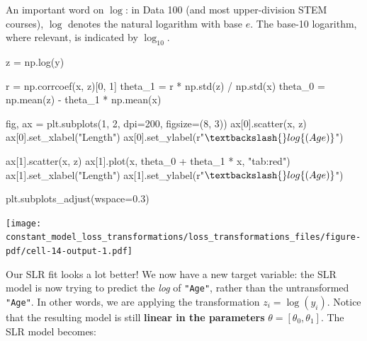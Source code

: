 \documentclass[
  letterpaper,
  DIV=11,
  numbers=noendperiod]{scrreprt}
\newenvironment{Shaded}{\begin{snugshade}}{\end{snugshade}}
\newcommand{\DecValTok}[1]{\textcolor[rgb]{0.68,0.00,0.00}{#1}}
\newcommand{\FloatTok}[1]{\textcolor[rgb]{0.68,0.00,0.00}{#1}}
\newcommand{\NormalTok}[1]{\textcolor[rgb]{0.00,0.23,0.31}{#1}}
\newcommand{\OperatorTok}[1]{\textcolor[rgb]{0.37,0.37,0.37}{#1}}
\newcommand{\StringTok}[1]{\textcolor[rgb]{0.13,0.47,0.30}{#1}}
\newcommand{\VerbatimStringTok}[1]{\textcolor[rgb]{0.13,0.47,0.30}{#1}}
\begin{document}
An important word on \(\log\): in Data 100 (and most upper-division STEM
courses), \(\log\) denotes the natural logarithm with base \(e\). The
base-10 logarithm, where relevant, is indicated by \(\log_{10}\).

\begin{Shaded}
\begin{Highlighting}[]
\NormalTok{z }\OperatorTok{=}\NormalTok{ np.log(y)}

\NormalTok{r }\OperatorTok{=}\NormalTok{ np.corrcoef(x, z)[}\DecValTok{0}\NormalTok{, }\DecValTok{1}\NormalTok{]}
\NormalTok{theta\_1 }\OperatorTok{=}\NormalTok{ r }\OperatorTok{*}\NormalTok{ np.std(z) }\OperatorTok{/}\NormalTok{ np.std(x)}
\NormalTok{theta\_0 }\OperatorTok{=}\NormalTok{ np.mean(z) }\OperatorTok{{-}}\NormalTok{ theta\_1 }\OperatorTok{*}\NormalTok{ np.mean(x)}

\NormalTok{fig, ax }\OperatorTok{=}\NormalTok{ plt.subplots(}\DecValTok{1}\NormalTok{, }\DecValTok{2}\NormalTok{, dpi}\OperatorTok{=}\DecValTok{200}\NormalTok{, figsize}\OperatorTok{=}\NormalTok{(}\DecValTok{8}\NormalTok{, }\DecValTok{3}\NormalTok{))}
\NormalTok{ax[}\DecValTok{0}\NormalTok{].scatter(x, z)}
\NormalTok{ax[}\DecValTok{0}\NormalTok{].set\_xlabel(}\StringTok{"Length"}\NormalTok{)}
\NormalTok{ax[}\DecValTok{0}\NormalTok{].set\_ylabel(}\VerbatimStringTok{r"$\textbackslash{}log\{(Age)\}$"}\NormalTok{)}

\NormalTok{ax[}\DecValTok{1}\NormalTok{].scatter(x, z)}
\NormalTok{ax[}\DecValTok{1}\NormalTok{].plot(x, theta\_0 }\OperatorTok{+}\NormalTok{ theta\_1 }\OperatorTok{*}\NormalTok{ x, }\StringTok{"tab:red"}\NormalTok{)}
\NormalTok{ax[}\DecValTok{1}\NormalTok{].set\_xlabel(}\StringTok{"Length"}\NormalTok{)}
\NormalTok{ax[}\DecValTok{1}\NormalTok{].set\_ylabel(}\VerbatimStringTok{r"$\textbackslash{}log\{(Age)\}$"}\NormalTok{)}

\NormalTok{plt.subplots\_adjust(wspace}\OperatorTok{=}\FloatTok{0.3}\NormalTok{)}
\end{Highlighting}
\end{Shaded}

\texttt{[image: constant\_model\_loss\_transformations/loss\_transformations\_files/figure-pdf/cell-14-output-1.pdf]}

Our SLR fit looks a lot better! We now have a new target variable: the
SLR model is now trying to predict the \emph{log} of \texttt{"Age"},
rather than the untransformed \texttt{"Age"}. In other words, we are
applying the transformation \(z_i = \log{(y_i)}\). Notice that the
resulting model is still \textbf{linear in the parameters}
\(\theta = [\theta_0, \theta_1]\). The SLR model becomes:
\end{document}
